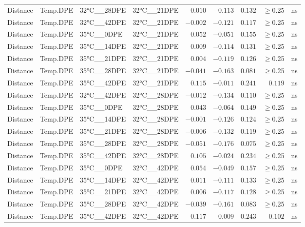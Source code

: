 \documentclass[
]{article}
\begin{document}
\begin{longtable}{llllrrrrl}
Distance & Temp.DPE & 32°C\_\_28DPE & 32°C\_\_21DPE & $0.010$ & $-0.113$ & $0.132$ & $\geq$0.25 & ns \\ 
Distance & Temp.DPE & 32°C\_\_42DPE & 32°C\_\_21DPE & $-0.002$ & $-0.121$ & $0.117$ & $\geq$0.25 & ns \\ 
Distance & Temp.DPE & 35°C\_\_0DPE & 32°C\_\_21DPE & $0.052$ & $-0.051$ & $0.155$ & $\geq$0.25 & ns \\ 
Distance & Temp.DPE & 35°C\_\_14DPE & 32°C\_\_21DPE & $0.009$ & $-0.114$ & $0.131$ & $\geq$0.25 & ns \\ 
Distance & Temp.DPE & 35°C\_\_21DPE & 32°C\_\_21DPE & $0.004$ & $-0.119$ & $0.126$ & $\geq$0.25 & ns \\ 
Distance & Temp.DPE & 35°C\_\_28DPE & 32°C\_\_21DPE & $-0.041$ & $-0.163$ & $0.081$ & $\geq$0.25 & ns \\ 
Distance & Temp.DPE & 35°C\_\_42DPE & 32°C\_\_21DPE & $0.115$ & $-0.011$ & $0.241$ & $0.119$ & ns \\ 
Distance & Temp.DPE & 32°C\_\_42DPE & 32°C\_\_28DPE & $-0.012$ & $-0.134$ & $0.110$ & $\geq$0.25 & ns \\ 
Distance & Temp.DPE & 35°C\_\_0DPE & 32°C\_\_28DPE & $0.043$ & $-0.064$ & $0.149$ & $\geq$0.25 & ns \\ 
Distance & Temp.DPE & 35°C\_\_14DPE & 32°C\_\_28DPE & $-0.001$ & $-0.126$ & $0.124$ & $\geq$0.25 & ns \\ 
Distance & Temp.DPE & 35°C\_\_21DPE & 32°C\_\_28DPE & $-0.006$ & $-0.132$ & $0.119$ & $\geq$0.25 & ns \\ 
Distance & Temp.DPE & 35°C\_\_28DPE & 32°C\_\_28DPE & $-0.051$ & $-0.176$ & $0.075$ & $\geq$0.25 & ns \\ 
Distance & Temp.DPE & 35°C\_\_42DPE & 32°C\_\_28DPE & $0.105$ & $-0.024$ & $0.234$ & $\geq$0.25 & ns \\ 
Distance & Temp.DPE & 35°C\_\_0DPE & 32°C\_\_42DPE & $0.054$ & $-0.049$ & $0.157$ & $\geq$0.25 & ns \\ 
Distance & Temp.DPE & 35°C\_\_14DPE & 32°C\_\_42DPE & $0.011$ & $-0.111$ & $0.133$ & $\geq$0.25 & ns \\ 
Distance & Temp.DPE & 35°C\_\_21DPE & 32°C\_\_42DPE & $0.006$ & $-0.117$ & $0.128$ & $\geq$0.25 & ns \\ 
Distance & Temp.DPE & 35°C\_\_28DPE & 32°C\_\_42DPE & $-0.039$ & $-0.161$ & $0.083$ & $\geq$0.25 & ns \\ 
Distance & Temp.DPE & 35°C\_\_42DPE & 32°C\_\_42DPE & $0.117$ & $-0.009$ & $0.243$ & $0.102$ & ns \\ 

\end{longtable}
\end{document}
